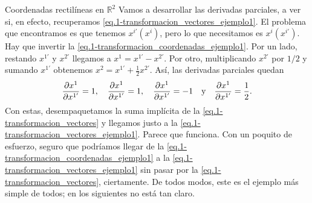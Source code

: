 \begin{example}{Coordenadas rectilíneas en \(\mathbb{R}^2\)}
    Vamos a desarrollar las derivadas parciales, a ver si, en efecto, recuperamos \cref{eq.1-transformacion_vectores_ejemplo1}. El problema que encontramos es que tenemos \(x^{i'}(x^i)\), pero lo que necesitamos es \(x^i(x^{i'})\). Hay que invertir la \cref{eq.1-transformacion_coordenadas_ejemplo1}. Por un lado, restando \(x^{1'}\) y \(x^{2'}\) llegamos a \(x^1 = x^{1'}-x^{2'}\). Por otro, multiplicando \(x^{2'}\) por \(1/2\) y sumando \(x^{1'}\) obtenemos \(x^2 = x^{1'}+\frac12x^{2'}\). Así, las  derivadas parciales quedan
    \begin{equation*}
         \frac{\partial x^{1}}{\partial x^{1'}} = 1, 
        \quad  \frac{\partial x^{1}}{\partial x^{1'}} = 1,
        \quad  \frac{\partial x^{1}}{\partial x^{1'}} = -1\quad \text{y}
        \quad  \frac{\partial x^{1}}{\partial x^{1'}} = \frac12.
    \end{equation*}
    Con estas, desempaquetamos la suma implícita de la \cref{eq.1-transformacion_vectores} y llegamos justo a la \cref{eq.1-transformacion_vectores_ejemplo1}. Parece que funciona. Con un poquito de esfuerzo, seguro que podríamos llegar de la \cref{eq.1-transformacion_coordenadas_ejemplo1} a la \cref{eq.1-transformacion_vectores_ejemplo1} sin pasar por la \cref{eq.1-transformacion_vectores}, ciertamente. De todos modos, este es el ejemplo más simple de todos; en los siguientes no está tan claro.
\end{example}

